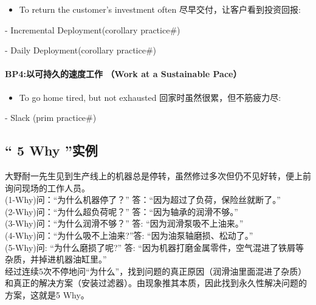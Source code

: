 \begin{itemize}
\tightlist
\item
  To return the customer's investment often
  尽早交付，让客户看到投资回报:
\end{itemize}

\begin{description}
\tightlist
\item[]
- Incremental Deployment(corollary practice\#)

- Daily Deployment(corollary practice\#)
\end{description}

\hypertarget{bp4ux4ee5ux53efux6301ux4e45ux7684ux901fux5ea6ux5de5ux4f5c-work-at-a-sustainable-pace}{%
\paragraph{BP4:以可持久的速度工作 （Work at a Sustainable
Pace）}\label{bp4ux4ee5ux53efux6301ux4e45ux7684ux901fux5ea6ux5de5ux4f5c-work-at-a-sustainable-pace}}

\begin{itemize}
\tightlist
\item
  To go home tired, but not exhausted 回家时虽然很累，但不筋疲力尽:\\
\end{itemize}

\begin{description}
\tightlist
\item[]
- Slack (prim practice\#)
\end{description}

\hypertarget{why-ux5b9eux4f8b}{%
\subsection{`` 5 Why ''实例}\label{why-ux5b9eux4f8b}}

大野耐一先生见到生产线上的机器总是停转，虽然修过多次但仍不见好转，便上前询问现场的工作人员。\\
(1-Why)问：``为什么机器停了？'' 答：``因为超过了负荷，保险丝就断了。''\\
(2-Why)问：``为什么超负荷呢？'' 答：``因为轴承的润滑不够。''\\
(3-Why)问：``为什么润滑不够？'' 答: ``因为润滑泵吸不上油来。''\\
(4-Why)问：``为什么吸不上油来?''答: ``因为油泵轴磨损、松动了。''\\
(5-Why)问: ``为什么磨损了呢?'' 答:
``因为机器打磨金属零件，空气混进了铁屑等杂质，并掉进机器油缸里。''\\
经过连续5次不停地问``为什么''，找到问题的真正原因（润滑油里面混进了杂质）和真正的解决方案（安装过滤器）。由现象推其本质，因此找到永久性解决问题的方案，这就是5
Why。

